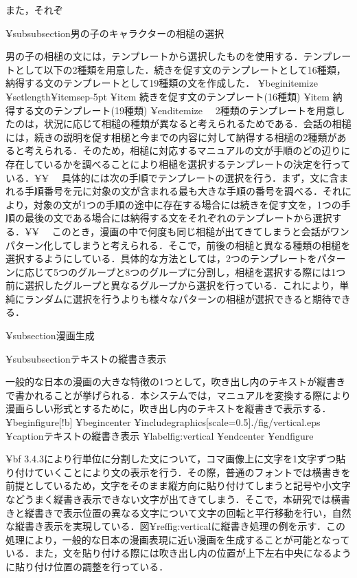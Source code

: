 また，それぞ

¥subsubsection{男の子のキャラクターの相槌の選択}

男の子の相槌の文には，テンプレートから選択したものを使用する．テンプレートとして以下の2種類を用意した．続きを促す文のテンプレートとして16種類，納得する文のテンプレートとして19種類の文を作成した．
¥begin{itemize}
¥setlength{¥itemsep}{-5pt}
¥item 続きを促す文のテンプレート(16種類)
¥item 納得する文のテンプレート(19種類)
¥end{itemize}
　2種類のテンプレートを用意したのは，状況に応じて相槌の種類が異なると考えられるためである．会話の相槌には，続きの説明を促す相槌と今までの内容に対して納得する相槌の2種類があると考えられる．そのため，相槌に対応するマニュアルの文が手順のどの辺りに存在しているかを調べることにより相槌を選択するテンプレートの決定を行っている．¥¥
　具体的には次の手順でテンプレートの選択を行う．まず，文に含まれる手順番号を元に対象の文が含まれる最も大きな手順の番号を調べる．それにより，対象の文が1つの手順の途中に存在する場合には続きを促す文を，1つの手順の最後の文である場合には納得する文をそれぞれのテンプレートから選択する．¥¥
　このとき，漫画の中で何度も同じ相槌が出てきてしまうと会話がワンパターン化してしまうと考えられる．そこで，前後の相槌と異なる種類の相槌を選択するようにしている．具体的な方法としては，2つのテンプレートをパターンに応じて5つのグループと8つのグループに分割し，相槌を選択する際には1つ前に選択したグループと異なるグループから選択を行っている．これにより，単純にランダムに選択を行うよりも様々なパターンの相槌が選択できると期待できる．

¥subsection{漫画生成}

¥subsubsection{テキストの縦書き表示}

一般的な日本の漫画の大きな特徴の1つとして，吹き出し内のテキストが縦書きで書かれることが挙げられる．本システムでは，マニュアルを変換する際により漫画らしい形式とするために，吹き出し内のテキストを縦書きで表示する．
¥begin{figure}[!b]
 ¥begin{center}
  ¥includegraphics[scale=0.5]{./fig/vertical.eps}
  ¥caption{テキストの縦書き表示}
  ¥label{fig:vertical}
 ¥end{center}
¥end{figure}

{¥bf 3.4.3}により行単位に分割した文について，コマ画像上に文字を1文字ずつ貼り付けていくことにより文の表示を行う．その際，普通のフォントでは横書きを前提としているため，文字をそのまま縦方向に貼り付けてしまうと記号や小文字などうまく縦書き表示できない文字が出てきてしまう．そこで，本研究では横書きと縦書きで表示位置の異なる文字について文字の回転と平行移動を行い，自然な縦書き表示を実現している．図¥ref{fig:vertical}に縦書き処理の例を示す．この処理により，一般的な日本の漫画表現に近い漫画を生成することが可能となっている．また，文を貼り付ける際には吹き出し内の位置が上下左右中央になるように貼り付け位置の調整を行っている．

